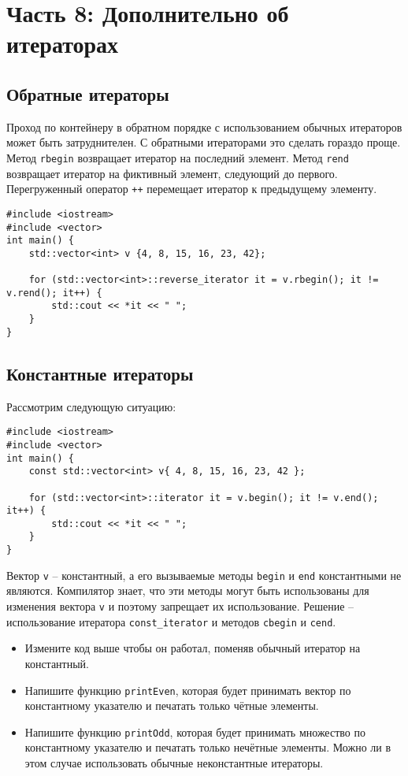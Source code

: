 \documentclass{article}
\begin{document}
\newpage
\section*{Часть 8: Дополнительно об итераторах}
\subsection*{Обратные итераторы}
Проход по контейнеру в обратном порядке с использованием обычных итераторов может быть затруднителен. С обратными итераторами это сделать гораздо проще. Метод \texttt{rbegin} возвращает итератор на последний элемент. Метод \texttt{rend} возвращает итератор на фиктивный элемент, следующий до первого. Перегруженный оператор \texttt{++} перемещает итератор к предыдущему элементу.
\begin{lstlisting}
#include <iostream>
#include <vector>
int main() {
    std::vector<int> v {4, 8, 15, 16, 23, 42};
    
    for (std::vector<int>::reverse_iterator it = v.rbegin(); it != v.rend(); it++) {
        std::cout << *it << " ";
    }
}
\end{lstlisting}
\subsection*{Константные итераторы}
Рассмотрим следующую ситуацию:
\begin{lstlisting}
#include <iostream>
#include <vector>
int main() {
    const std::vector<int> v{ 4, 8, 15, 16, 23, 42 };

    for (std::vector<int>::iterator it = v.begin(); it != v.end(); it++) {
        std::cout << *it << " ";
    }
}
\end{lstlisting}
Вектор \texttt{v} -- константный, а его вызываемые методы \texttt{begin} и \texttt{end} константными не являются. Компилятор знает, что эти методы могут быть использованы для изменения вектора \texttt{v} и поэтому запрещает их использование. Решение -- использование итератора \texttt{const\_iterator} и методов \texttt{cbegin} и \texttt{cend}.

\begin{itemize}
\item Измените код выше чтобы он работал, поменяв обычный итератор на константный.
\item Напишите функцию \texttt{printEven}, которая будет принимать вектор по константному указателю и печатать только чётные элементы.
\item Напишите функцию \texttt{printOdd}, которая будет принимать множество по константному указателю и печатать только нечётные элементы. Можно ли в этом случае использовать обычные неконстантные итераторы.
\end{itemize}
\end{document}
